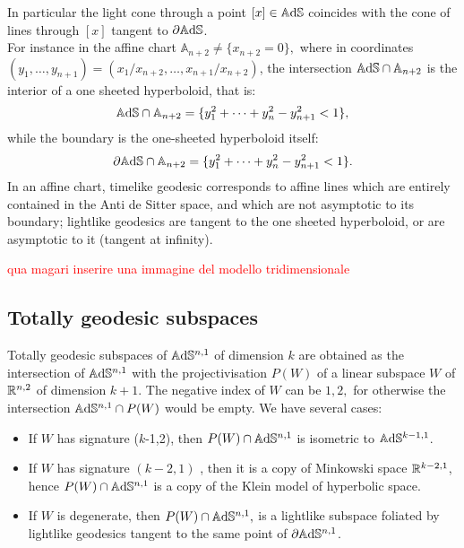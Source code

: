 In particular the light cone through a point $[x]\in \mathbb{A}\mathrm{d}\mathbb{S}$ coincides with the cone of lines through $[x]$ tangent to $\partial \mathbb{A}\mathrm{d}\mathbb{S}$.\\ For instance in the affine chart $\mathbb{A}_{n+2}\neq\{x_{n+2}=0\},$ where in coordinates $(y_1, \dots, y_{n+1})=(x_1/x_{n+2},\dots, x_{n+1}/x_{n+2})$, the intersection $\mathbb{A}\mathrm{d}\mathbb{S}\cap\mathbb{A}_{n+2}$ is the interior of a one sheeted hyperboloid, that is: 
\[
    \mathbb{A}\mathrm{d}\mathbb{S}\cap\mathbb{A}_{n+2}=\{y_1^2+\dots+y_n^2-y_{n+1}^2<1\},
\]
 while the boundary is the one-sheeted hyperboloid itself: 
 \[
    \partial\mathbb{A}\mathrm{d}\mathbb{S}\cap\mathbb{A}_{n+2}=\{y_1^2+\dots+y_n^2-y_{n+1}^2<1\}.
\]
In an affine chart, timelike geodesic corresponds to affine lines which are entirely contained in the Anti de Sitter space, and which are not asymptotic to its boundary; lightlike geodesics are tangent to the one sheeted hyperboloid, or are asymptotic to it (tangent at infinity).

\textcolor{red}{qua magari inserire una immagine del modello tridimensionale}


\subsection{Totally geodesic subspaces} Totally geodesic subspaces of $\mathbb{A}\mathrm{d}\mathbb{S}^{n,1}$ of dimension $k$ are obtained as the intersection of $\mathbb{A}\mathrm{d}\mathbb{S}^{n,1}$ with the projectivisation $P(W)$ of a linear subspace $W$ of $\mathbb{R}^{n,2}$ of dimension $k+1.$ The negative index of $W$ can be $1, 2,$ for otherwise the intersection $\mathbb{A}\mathrm{d}\mathbb{S}^{n,1}\cap P(W)$ would be empty. We have several cases: 
\begin{itemize}
    \item If $W$ has signature ($k$-1,2), then $P(W)\cap \mathbb{A}\mathrm{d}\mathbb{S}^{n,1}$ is isometric to $\mathbb{A}\mathrm{d}\mathbb{S}^{k-1,1}$. 
    \item If $W$ has signature $(k-2, 1)$ , then it is a copy of Minkowski space $\mathbb{R}^{k-2,1}$, hence $P(W)\cap \mathbb{A}\mathrm{d}\mathbb{S}^{n,1}$ is a copy of the Klein model of hyperbolic space. 
    \item If $W$ is degenerate, then $P(W)\cap \mathbb{A}\mathrm{d}\mathbb{S}^{n,1},$ is a lightlike subspace foliated by lightlike geodesics tangent to the same point of $\partial\mathbb{A}\mathrm{d}\mathbb{S}^{n,1}$. 
\end{itemize}  

